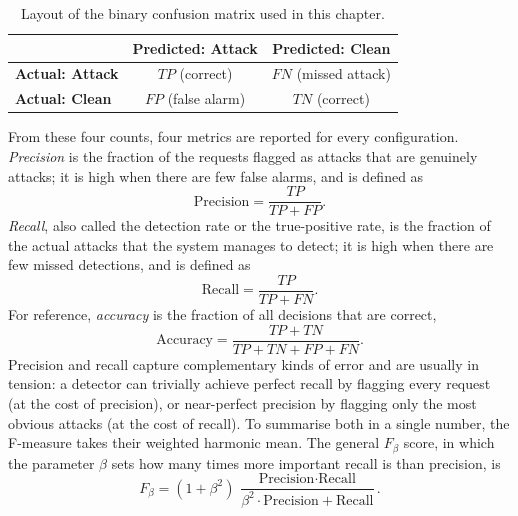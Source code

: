 \documentclass[12pt,a4paper]{report}
\begin{document}
\begin{table}[ht]
  \centering
  \caption{Layout of the binary confusion matrix used in this chapter.}
  \label{tab:cm}
  \renewcommand{\arraystretch}{1.35}
  \setlength{\tabcolsep}{10pt}
  \footnotesize
  \begin{tabular}{|l|c|c|}
    \hline
    & \textbf{Predicted: Attack} & \textbf{Predicted: Clean} \\
    \hline
    \textbf{Actual: Attack} & $TP$ (correct) & $FN$ (missed attack) \\
    \hline
    \textbf{Actual: Clean} & $FP$ (false alarm) & $TN$ (correct) \\
    \hline
  \end{tabular}
\end{table}

From these four counts, four metrics are reported for every configuration.
\emph{Precision} is the fraction of the requests flagged as attacks that are
genuinely attacks; it is high when there are few false alarms, and is defined
as
\begin{equation}
  \text{Precision} = \frac{TP}{TP + FP}.
  \label{eq:precision}
\end{equation}
\emph{Recall}, also called the detection rate or the true-positive rate, is
the fraction of the actual attacks that the system manages to detect; it is
high when there are few missed detections, and is defined as
\begin{equation}
  \text{Recall} = \frac{TP}{TP + FN}.
  \label{eq:recall}
\end{equation}
For reference, \emph{accuracy} is the fraction of all decisions that are
correct,
\begin{equation}
  \text{Accuracy} = \frac{TP + TN}{TP + TN + FP + FN}.
  \label{eq:accuracy}
\end{equation}
Precision and recall capture complementary kinds of error and are usually in
tension: a detector can trivially achieve perfect recall by flagging every
request (at the cost of precision), or near-perfect precision by flagging only
the most obvious attacks (at the cost of recall). To summarise both in a
single number, the F-measure takes their weighted harmonic mean. The general
$F_\beta$ score, in which the parameter $\beta$ sets how many times more
important recall is than precision, is
\begin{equation}
  F_\beta = (1 + \beta^2)\,\frac{\text{Precision} \cdot \text{Recall}}
                 {\beta^2 \cdot \text{Precision} + \text{Recall}}.
  \label{eq:fbeta}
\end{equation}
\end{document}
